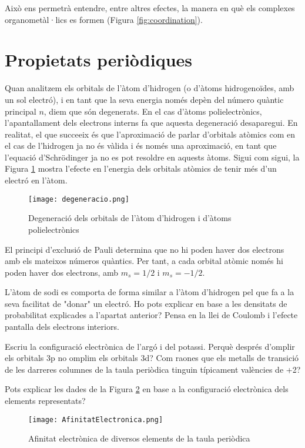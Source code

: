 


Això ens permetrà  entendre, entre altres efectes, la manera en què els complexes organometàl·lics es formen (Figura \ref{fig:coordination}).



\section{Propietats periòdiques}

Quan analitzem els orbitals de l'àtom d'hidrogen (o d'àtoms hidrogenoïdes, amb un sol electró), i en tant que la seva energia només depèn del número quàntic principal $n$, diem que són degenerats. En el cas d'àtoms polielectrònics, l'apantallament dels electrons interns fa que aquesta degeneració desaparegui. En realitat, el que succeeix és que l'aproximació de parlar d'orbitals atòmics com en el cas de l'hidrogen ja no és vàlida i és només una aproximació, en tant que l'equació d'Schrödinger ja no es pot resoldre en aquests àtoms.
Sigui com sigui, la Figura \ref{fig:degeneracio} mostra l'efecte en l'energia dels orbitals atòmics de tenir més d'un electró en l'àtom.

\begin{figure}[h]
\centering
\texttt{[image: degeneracio.png]}
\caption{Degeneració dels orbitals de l'àtom d'hidrogen i d'àtoms polielectrònics}
\label{fig:degeneracio}
\end{figure}

El principi d'exclusió de Pauli determina que no hi poden haver dos electrons amb els mateixos números quàntics. Per tant, a cada orbital atòmic només hi poden haver dos electrons, amb $m_s=1/2$ i $m_s=-1/2$.
\begin{exr}
L'àtom de sodi es comporta de forma similar a l'àtom d'hidrogen pel que fa a la seva facilitat de "donar" un electró. Ho pots explicar en base a les densitats de probabilitat explicades a l'apartat anterior? Pensa en la llei de Coulomb i l'efecte pantalla dels electrons interiors.
\end{exr}
\begin{exr}
Escriu la configuració electrònica de l'argó i del potassi. Perquè després d'omplir els orbitals 3p no omplim els orbitals 3d? Com raones que els metalls de transició de les  darreres columnes de la taula periòdica tinguin típicament valències de +2?
\end{exr}
\begin{exr}
Pots explicar les dades de la Figura \ref{fig:AfinitatElectronica} en base a la configuració electrònica dels elements representats?
\end{exr}

\begin{figure}
\centering
\texttt{[image: AfinitatElectronica.png]}
\caption{Afinitat electrònica de diversos elements de la taula periòdica}
\label{fig:AfinitatElectronica}
\end{figure}

